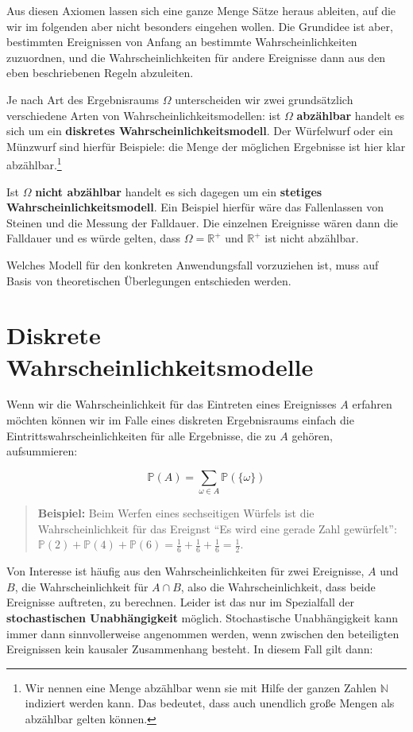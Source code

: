\documentclass[]{book}
\let\rmarkdownfootnote\footnote%
\def\footnote{\protect\rmarkdownfootnote}
\begin{document}
Aus diesen Axiomen lassen sich eine ganze Menge Sätze heraus ableiten,
auf die wir im folgenden aber nicht besonders eingehen wollen. Die
Grundidee ist aber, bestimmten Ereignissen von Anfang an bestimmte
Wahrscheinlichkeiten zuzuordnen, und die Wahrscheinlichkeiten für andere
Ereignisse dann aus den eben beschriebenen Regeln abzuleiten.

Je nach Art des Ergebnisraums \(\Omega\) unterscheiden wir zwei
grundsätzlich verschiedene Arten von Wahrscheinlichkeitsmodellen: ist
\(\Omega\) \textbf{abzählbar} handelt es sich um ein \textbf{diskretes
Wahrscheinlichkeitsmodell}. Der Würfelwurf oder ein Münzwurf sind
hierfür Beispiele: die Menge der möglichen Ergebnisse ist hier klar
abzählbar.\footnote{Wir nennen eine Menge abzählbar wenn sie mit Hilfe
  der ganzen Zahlen \(\mathbb{N}\) indiziert werden kann. Das bedeutet,
  dass auch unendlich große Mengen als abzählbar gelten können.}

Ist \(\Omega\) \textbf{nicht abzählbar} handelt es sich dagegen um ein
\textbf{stetiges Wahrscheinlichkeitsmodell}. Ein Beispiel hierfür wäre
das Fallenlassen von Steinen und die Messung der Falldauer. Die
einzelnen Ereignisse wären dann die Falldauer und es würde gelten, dass
\(\Omega=\mathbb{R^+}\) und \(\mathbb{R^+}\) ist nicht abzählbar.

Welches Modell für den konkreten Anwendungsfall vorzuziehen ist, muss
auf Basis von theoretischen Überlegungen entschieden werden.

\section{Diskrete
Wahrscheinlichkeitsmodelle}\label{diskrete-wahrscheinlichkeitsmodelle}

Wenn wir die Wahrscheinlichkeit für das Eintreten eines Ereignisses
\(A\) erfahren möchten können wir im Falle eines diskreten Ergebnisraums
einfach die Eintrittswahrscheinlichkeiten für alle Ergebnisse, die zu
\(A\) gehören, aufsummieren:

\[ \mathbb{P}(A)=\sum_{\omega\in A} \mathbb{P}(\{\omega\})\]

\begin{quote}
\textbf{Beispiel:} Beim Werfen eines sechseitigen Würfels ist die
Wahrscheinlichkeit für das Ereignst ``Es wird eine gerade Zahl
gewürfelt'':
\(\mathbb{P}(2)+\mathbb{P}(4)+\mathbb{P}(6)=\frac{1}{6}+\frac{1}{6}+\frac{1}{6}=\frac{1}{2}\).
\end{quote}

Von Interesse ist häufig aus den Wahrscheinlichkeiten für zwei
Ereignisse, \(A\) und \(B\), die Wahrscheinlichkeit für \(A\cap B\),
also die Wahrscheinlichkeit, dass beide Ereignisse auftreten, zu
berechnen. Leider ist das nur im Spezialfall der \textbf{stochastischen
Unabhängigkeit} möglich. Stochastische Unabhängigkeit kann immer dann
sinnvollerweise angenommen werden, wenn zwischen den beteiligten
Ereignissen kein kausaler Zusammenhang besteht. In diesem Fall gilt
dann:
\end{document}
